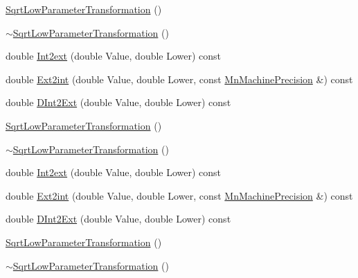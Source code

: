 \begin{DoxyCompactItemize}
\item 
\mbox{\hyperlink{classROOT_1_1Minuit2_1_1SqrtLowParameterTransformation_a2ed65b844471f395ab4528823afe39b6}{Sqrt\+Low\+Parameter\+Transformation}} ()
\item 
\mbox{\hyperlink{classROOT_1_1Minuit2_1_1SqrtLowParameterTransformation_acb1b80dd60331a48c2352696ff96784f}{$\sim$\+Sqrt\+Low\+Parameter\+Transformation}} ()
\item 
double \mbox{\hyperlink{classROOT_1_1Minuit2_1_1SqrtLowParameterTransformation_aaa3325280a05beb0e3f07b542d0aa7d8}{Int2ext}} (double Value, double Lower) const
\item 
double \mbox{\hyperlink{classROOT_1_1Minuit2_1_1SqrtLowParameterTransformation_a2035002e75f51cafc5e5d8afc05913e6}{Ext2int}} (double Value, double Lower, const \mbox{\hyperlink{classROOT_1_1Minuit2_1_1MnMachinePrecision}{Mn\+Machine\+Precision}} \&) const
\item 
double \mbox{\hyperlink{classROOT_1_1Minuit2_1_1SqrtLowParameterTransformation_ade7d793a9299b15dc6e218a11efdb15e}{D\+Int2\+Ext}} (double Value, double Lower) const
\item 
\mbox{\hyperlink{classROOT_1_1Minuit2_1_1SqrtLowParameterTransformation_a2ed65b844471f395ab4528823afe39b6}{Sqrt\+Low\+Parameter\+Transformation}} ()
\item 
\mbox{\hyperlink{classROOT_1_1Minuit2_1_1SqrtLowParameterTransformation_acb1b80dd60331a48c2352696ff96784f}{$\sim$\+Sqrt\+Low\+Parameter\+Transformation}} ()
\item 
double \mbox{\hyperlink{classROOT_1_1Minuit2_1_1SqrtLowParameterTransformation_aaa3325280a05beb0e3f07b542d0aa7d8}{Int2ext}} (double Value, double Lower) const
\item 
double \mbox{\hyperlink{classROOT_1_1Minuit2_1_1SqrtLowParameterTransformation_a2035002e75f51cafc5e5d8afc05913e6}{Ext2int}} (double Value, double Lower, const \mbox{\hyperlink{classROOT_1_1Minuit2_1_1MnMachinePrecision}{Mn\+Machine\+Precision}} \&) const
\item 
double \mbox{\hyperlink{classROOT_1_1Minuit2_1_1SqrtLowParameterTransformation_ade7d793a9299b15dc6e218a11efdb15e}{D\+Int2\+Ext}} (double Value, double Lower) const
\item 
\mbox{\hyperlink{classROOT_1_1Minuit2_1_1SqrtLowParameterTransformation_a2ed65b844471f395ab4528823afe39b6}{Sqrt\+Low\+Parameter\+Transformation}} ()
\item 
\mbox{\hyperlink{classROOT_1_1Minuit2_1_1SqrtLowParameterTransformation_acb1b80dd60331a48c2352696ff96784f}{$\sim$\+Sqrt\+Low\+Parameter\+Transformation}} ()

\end{DoxyCompactItemize}
